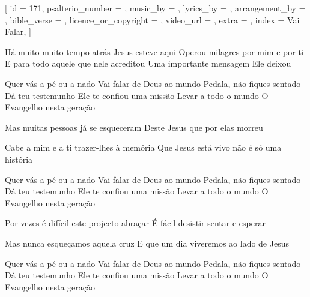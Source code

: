 
[
    id                     = {171},
    psalterio_number       = {},
    music_by               = {},
    lyrics_by              = {},
    arrangement_by         = {},
    bible_verse            = {},
    licence_or_copyright   = {},
    video_url              = {},
    extra                  = {},
    index                  = {Vai Falar},
]


\beginverse

Há muito muito tempo atrás Jesus esteve aqui
Operou milagres por mim e por ti
E para todo aquele que nele acreditou
Uma importante mensagem Ele deixou

\endverse


\beginchorus

Quer vás a pé ou a nado
Vai falar de Deus ao mundo
Pedala, não fiques sentado
Dá teu testemunho
Ele te confiou uma missão
Levar a todo o mundo
O Evangelho nesta geração

\endchorus


\beginverse

Mas muitas pessoas já se esqueceram
Deste Jesus que por elas morreu

Cabe a mim e a ti trazer-lhes à memória
Que Jesus está vivo não é só uma história

\endverse


\beginchorus

Quer vás a pé ou a nado
Vai falar de Deus ao mundo
Pedala, não fiques sentado
Dá teu testemunho
Ele te confiou uma missão
Levar a todo o mundo
O Evangelho nesta geração

\endchorus



\beginverse

Por vezes é difícil este projecto abraçar
É fácil desistir sentar e esperar

Mas nunca esqueçamos aquela cruz
E que um dia viveremos ao lado de Jesus

\endverse


\beginchorus

Quer vás a pé ou a nado
Vai falar de Deus ao mundo
Pedala, não fiques sentado
Dá teu testemunho
Ele te confiou uma missão
Levar a todo o mundo
O Evangelho nesta geração

\endchorus

\endsong
